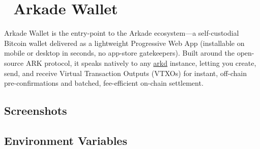 \documentclass[
]{article}
\author{}
\date{}
\begin{document}
\hypertarget{arkade-wallet}{%
\section{👾 Arkade Wallet}\label{arkade-wallet}}

Arkade Wallet is the entry-point to the Arkade ecosystem---a
self-custodial Bitcoin wallet delivered as a lightweight Progressive Web
App (installable on mobile or desktop in seconds, no app-store
gatekeepers). Built around the open-source ARK protocol, it speaks
natively to any \href{https://github.com/arkade-os/arkd}{arkd} instance,
letting you create, send, and receive Virtual Transaction Outputs
(VTXOs) for instant, off-chain pre-confirmations and batched,
fee-efficient on-chain settlement.

\hypertarget{screenshots}{%
\subsection{Screenshots}\label{screenshots}}

\hypertarget{environment-variables}{%
\subsection{Environment Variables}\label{environment-variables}}
\end{document}
